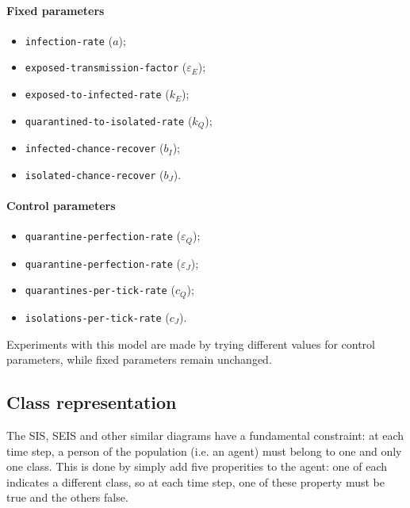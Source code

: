 \documentclass[12pt]{llncs}
\begin{document}
\paragraph{Fixed parameters}
\begin{itemize}
\item \texttt{infection-rate} ($a$);
\item \texttt{exposed-transmission-factor} ($\varepsilon_E$);
\item \texttt{exposed-to-infected-rate} ($k_E$);
\item \texttt{quarantined-to-isolated-rate} ($k_Q$);
\item \texttt{infected-chance-recover} ($b_I$);
\item \texttt{isolated-chance-recover} ($b_J$).
\end{itemize}

\paragraph{Control parameters}
\begin{itemize}
\item \texttt{quarantine-perfection-rate} ($\varepsilon_Q$);
\item \texttt{quarantine-perfection-rate} ($\varepsilon_J$);
\item \texttt{quarantines-per-tick-rate} ($c_Q$);
\item \texttt{isolations-per-tick-rate} ($c_J$).
\end{itemize}

Experiments with this model are made by trying different values for control parameters, while fixed parameters remain unchanged.

\subsection{Class representation}
The SIS, SEIS and other similar diagrams have a fundamental constraint: at each time step, a person of the population (i.e. an agent) must belong to one and only one class. This is done by simply add five properities to the agent: one of each indicates a different class, so at each time step, one of these property must be true and the others false.
\end{document}
